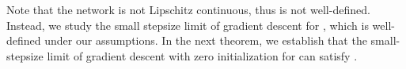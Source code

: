 
Note that the network  is not Lipschitz continuous, thus  is not well-defined. Instead, we study the small stepsize limit of gradient descent for , which is well-defined under our assumptions.
In the next theorem, we establish that the small-stepsize limit of gradient descent with zero initialization for  can satisfy .

